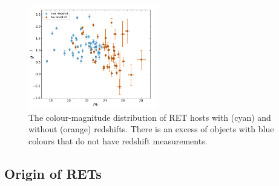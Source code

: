 \documentclass[fleqn,usenatbib,]{mnras}
\begin{document}
\begin{figure}
\includegraphics[width=0.5\textwidth]{figs/mag_v_colour.png}
\caption{The colour-magnitude distribution of RET hosts with (cyan) and without (orange) redshifts. There is an excess of objects with blue colours that do not have redshift measurements.
\label{fig:g-i}}
\end{figure}


\subsection{Origin of RETs \label{subsec:disc_origin}}
\end{document}
